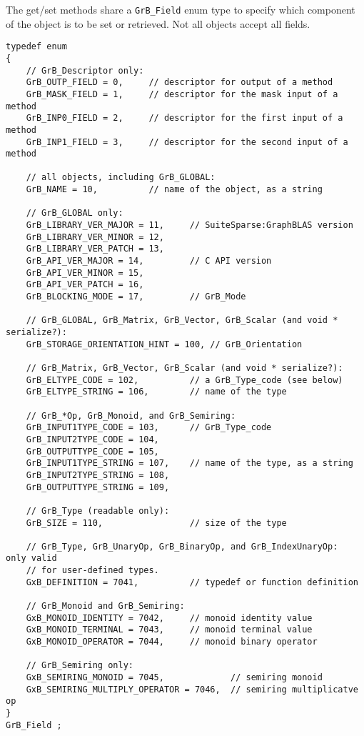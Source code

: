 The get/set methods share a \verb'GrB_Field' enum type to specify which
component of the object is to be set or retrieved.  Not all objects accept all
fields.

{\footnotesize
\begin{verbatim}
typedef enum
{
    // GrB_Descriptor only:
    GrB_OUTP_FIELD = 0,     // descriptor for output of a method
    GrB_MASK_FIELD = 1,     // descriptor for the mask input of a method
    GrB_INP0_FIELD = 2,     // descriptor for the first input of a method
    GrB_INP1_FIELD = 3,     // descriptor for the second input of a method

    // all objects, including GrB_GLOBAL:
    GrB_NAME = 10,          // name of the object, as a string

    // GrB_GLOBAL only:
    GrB_LIBRARY_VER_MAJOR = 11,     // SuiteSparse:GraphBLAS version
    GrB_LIBRARY_VER_MINOR = 12,
    GrB_LIBRARY_VER_PATCH = 13,
    GrB_API_VER_MAJOR = 14,         // C API version
    GrB_API_VER_MINOR = 15,
    GrB_API_VER_PATCH = 16,
    GrB_BLOCKING_MODE = 17,         // GrB_Mode

    // GrB_GLOBAL, GrB_Matrix, GrB_Vector, GrB_Scalar (and void * serialize?):
    GrB_STORAGE_ORIENTATION_HINT = 100, // GrB_Orientation

    // GrB_Matrix, GrB_Vector, GrB_Scalar (and void * serialize?):
    GrB_ELTYPE_CODE = 102,          // a GrB_Type_code (see below)
    GrB_ELTYPE_STRING = 106,        // name of the type

    // GrB_*Op, GrB_Monoid, and GrB_Semiring:
    GrB_INPUT1TYPE_CODE = 103,      // GrB_Type_code
    GrB_INPUT2TYPE_CODE = 104,
    GrB_OUTPUTTYPE_CODE = 105,
    GrB_INPUT1TYPE_STRING = 107,    // name of the type, as a string
    GrB_INPUT2TYPE_STRING = 108,
    GrB_OUTPUTTYPE_STRING = 109,

    // GrB_Type (readable only):
    GrB_SIZE = 110,                 // size of the type

    // GrB_Type, GrB_UnaryOp, GrB_BinaryOp, and GrB_IndexUnaryOp:  only valid
    // for user-defined types.
    GxB_DEFINITION = 7041,          // typedef or function definition

    // GrB_Monoid and GrB_Semiring:
    GxB_MONOID_IDENTITY = 7042,     // monoid identity value
    GxB_MONOID_TERMINAL = 7043,     // monoid terminal value
    GxB_MONOID_OPERATOR = 7044,     // monoid binary operator

    // GrB_Semiring only:
    GxB_SEMIRING_MONOID = 7045,             // semiring monoid
    GxB_SEMIRING_MULTIPLY_OPERATOR = 7046,  // semiring multiplicatve op
}
GrB_Field ;


\end{verbatim}}
